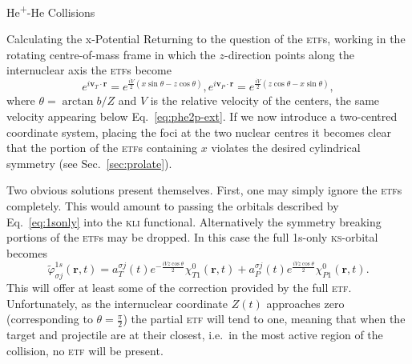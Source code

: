 \documentclass[a5paper, 9 pt]{extreport}
\begin{document}
\begin{chapter}{\texorpdfstring{He\textsuperscript{+}}{He+}-He Collisions \label{chap:hephe}}
\begin{section}{Calculating the x-Potential \label{sec:pot}}
      Returning to the question of the \textsc{etf}s, working in the rotating centre-of-mass frame in
      which the $z$-direction points along the internuclear axis the \textsc{etf}s become
      \begin{subequations} \label{eq:etf}
         \begin{equation} \label{eq:etfT}
            e^{i \mathbf{v}_T \cdot \mathbf{r}} =
             e^{\frac{i V}{2} (x \sin \theta - z \cos \theta)},
         \end{equation}
         \begin{equation} \label{eq:etfP}
            e^{i \mathbf{v}_P \cdot \mathbf{r}} =
             e^{\frac{i V}{2} (z \cos \theta - x \sin \theta)},
         \end{equation}
      \end{subequations}
      where $\theta = \arctan b/Z$ and $V$ is the relative velocity of the centers, the same velocity
      appearing below Eq.~\eqref{eq:phe2p-ext}. If we now introduce a two-centred coordinate system,
      placing the foci at the two nuclear centres it becomes clear that the portion of the \textsc{etf}s
      containing $x$ violates the desired cylindrical symmetry (see Sec.~\ref{sec:prolate}).

      Two obvious solutions present themselves. First, one may simply ignore the \textsc{etf}s
      completely. This would amount to passing the orbitals described by Eq.~\eqref{eq:1sonly} into
      the \textsc{kli} functional. Alternatively the symmetry breaking portions of the \textsc{etf}s
      may be dropped. In this case the full 1s-only \textsc{ks}-orbital becomes
      \begin{equation} \label{eq:1sonlyetf}
         \tilde{\varphi}_{\sigma j}^{1s} (\mathbf{r},t) =
                      a^{\sigma j}_T (t)  e^{-\frac{i V z \cos \theta}{2}} \chi^{0}_{T1} (\mathbf{r},t)
                    + a^{\sigma j}_P (t)  e^{ \frac{i V z \cos \theta}{2}} \chi^{0}_{P1} (\mathbf{r},t).
      \end{equation}
      This will offer at least some of the correction provided by the full \textsc{etf}. Unfortunately,
      as the internuclear coordinate $Z(t)$ approaches zero (corresponding to $\theta = \frac{\pi}{2}$)
      the partial \textsc{etf} will tend to one, meaning that when the target and projectile are at
      their closest, i.e.\ in the most active region of the collision, no \textsc{etf} will be present.


\end{section}
\end{chapter}
\end{document}
